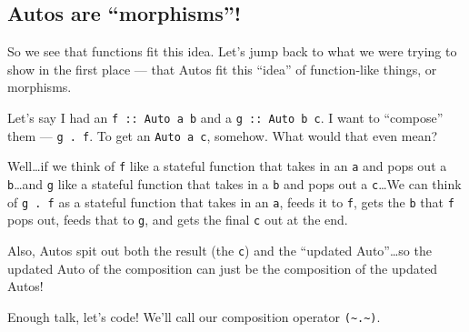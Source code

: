 \documentclass[]{article}
\newenvironment{Shaded}{}{}
\newcommand{\CommentTok}[1]{\textcolor[rgb]{0.38,0.63,0.69}{\textit{#1}}}
\newcommand{\DataTypeTok}[1]{\textcolor[rgb]{0.56,0.13,0.00}{#1}}
\newcommand{\KeywordTok}[1]{\textcolor[rgb]{0.00,0.44,0.13}{\textbf{#1}}}
\newcommand{\NormalTok}[1]{#1}
\newcommand{\OperatorTok}[1]{\textcolor[rgb]{0.40,0.40,0.40}{#1}}
\newcommand{\OtherTok}[1]{\textcolor[rgb]{0.00,0.44,0.13}{#1}}
\begin{document}
\subsection{Autos are ``morphisms''!}\label{autos-are-morphisms}

So we see that functions fit this idea. Let's jump back to what we were trying
to show in the first place --- that Autos fit this ``idea'' of function-like
things, or morphisms.

Let's say I had an \texttt{f\ ::\ Auto\ a\ b} and a \texttt{g\ ::\ Auto\ b\ c}.
I want to ``compose'' them --- \texttt{g\ .\ f}. To get an \texttt{Auto\ a\ c},
somehow. What would that even mean?

Well\ldots if we think of \texttt{f} like a stateful function that takes in an
\texttt{a} and pops out a \texttt{b}\ldots and \texttt{g} like a stateful
function that takes in a \texttt{b} and pops out a \texttt{c}\ldots We can think
of \texttt{g\ .\ f} as a stateful function that takes in an \texttt{a}, feeds it
to \texttt{f}, gets the \texttt{b} that \texttt{f} pops out, feeds that to
\texttt{g}, and gets the final \texttt{c} out at the end.

Also, Autos spit out both the result (the \texttt{c}) and the ``updated
Auto''\ldots so the updated Auto of the composition can just be the composition
of the updated Autos!

Enough talk, let's code! We'll call our composition operator
\texttt{(\textasciitilde{}.\textasciitilde{})}.

\begin{Shaded}
\end{Shaded}
\end{document}
